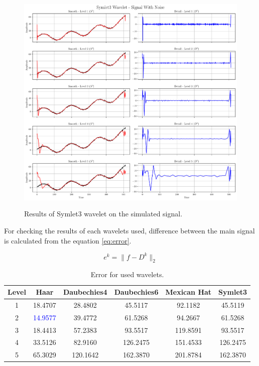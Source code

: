\documentclass[12pt]{article}
\begin{document}
	\clearpage
	\begin{figure}[!h]
		\centering
		\includegraphics[height=11cm]{../Tests/Outputs/Symlet3Wavelet_SignalWithNoise.pdf}
		\caption{Results of Symlet3 wavelet on the simulated signal.}
		\label{fig:1d_sym3}
	\end{figure}
	
	For checking the results of each wavelets used, difference between the main signal is calculated from the equation \ref{eq:error}.
	
	\begin{equation}
		e^k = \|f-D^k\|_2
		\label{eq:error}
	\end{equation}
	
	\begin{table}[h!]
		\centering
		\caption{Error for used wavelets.}
		\vspace{0.3cm}
		\renewcommand{\arraystretch}{1.4}
		\begin{tabular}{c|c|c|c|c|c}
			\textbf{Level} & \textbf{Haar} & \textbf{Daubechies4} & \textbf{Daubechies6} & \textbf{Mexican Hat} & \textbf{Symlet3} \\
			\hline 
			1 & 18.4707 & 28.4802 & 45.5117 & 92.1182 & 45.5119 \\
			2 & \textcolor{blue}{14.9577} & 39.4772 & 61.5268 & 94.2667 & 61.5268 \\
			3 & 18.4413 & 57.2383 & 93.5517 & 119.8591 & 93.5517 \\
			4 & 33.5126 & 82.9160 & 126.2475 & 151.4533 & 126.2475 \\
			5 & 65.3029 & 120.1642 & 162.3870 & 201.8784 & 162.3870 \\
		\end{tabular}
		\label{tab:errors}
	\end{table}
	
\end{document}
